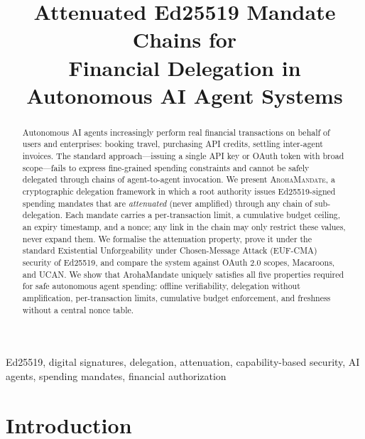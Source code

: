 \documentclass[conference]{IEEEtran}
\begin{document}
\title{Attenuated Ed25519 Mandate Chains for\\
       Financial Delegation in Autonomous AI Agent Systems}

\author{
}

\maketitle

\begin{abstract}
Autonomous AI agents increasingly perform real financial
transactions on behalf of users and enterprises: booking
travel, purchasing API credits, settling inter-agent
invoices. The standard approach—issuing a single API key
or OAuth token with broad scope—fails to express
fine-grained spending constraints and cannot be safely
delegated through chains of agent-to-agent invocation.
We present \textsc{ArohaMandate}, a cryptographic
delegation framework in which a root authority issues
Ed25519-signed spending mandates that are \emph{attenuated}
(never amplified) through any chain of sub-delegation.
Each mandate carries a per-transaction limit, a cumulative
budget ceiling, an expiry timestamp, and a nonce; any
link in the chain may only restrict these values, never
expand them.  We formalise the attenuation property, prove
it under the standard Existential Unforgeability under
Chosen-Message Attack (EUF-CMA) security of Ed25519,
and compare the system against OAuth 2.0 scopes, Macaroons,
and UCAN.  We show that ArohaMandate uniquely satisfies
all five properties required for safe autonomous agent
spending: offline verifiability, delegation without
amplification, per-transaction limits, cumulative budget
enforcement, and freshness without a central nonce table.
\end{abstract}

\begin{IEEEkeywords}
Ed25519, digital signatures, delegation, attenuation,
capability-based security, AI agents, spending mandates,
financial authorization
\end{IEEEkeywords}

\section{Introduction}
\label{sec:intro}
\end{document}

